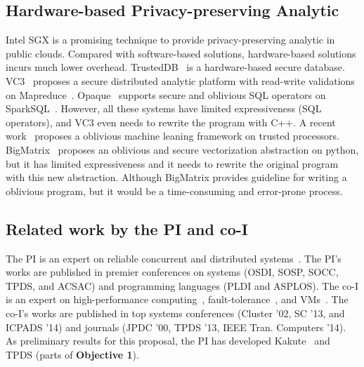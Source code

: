 \subsection{Hardware-based Privacy-preserving Analytic}
Intel SGX is a promising technique to provide privacy-preserving analytic
in public clouds. Compared with software-based solutions, hardware-based 
solutions
incurs much lower overhead. TrustedDB~\cite{trusteddb:sigmod11} is a
hardware-based secure database.
VC3~\cite{vc3:sp15} proposes a secure distributed analytic platform
with read-write validations on Mapreduce~\cite{mapreduce}. 
Opaque~\cite{opaque:nsdi17}
supports secure and oblivious SQL operators on 
SparkSQL~\cite{sparksql:sigmod15}.
However, all these systems have limited expressiveness (\eg SQL operators), and
VC3 even needs to rewrite the program with C++. A recent 
work~\cite{oblivious:security16} proposes a oblivious machine leaning
framework on trusted processors.
BigMatrix~\cite{bigmatrix:ccs17} proposes an oblivious and secure vectorization
abstraction on python, but it has limited expressiveness and it needs to
rewrite the original program with this new abstraction.
Although BigMatrix provides guideline for
writing a oblivious program, but it would be a time-consuming and error-prone
process.

\vspace{-.15in}\subsection{Related work by the PI and co-I} 
\label{sec:my-work}\vspace{-.075in}
% 

The PI is an expert on reliable concurrent and distributed 
systems~\cite{smt:cacm, cui:tern:osdi10, peregrine:sosp11,
parrot:sosp13, crane:sosp15, tripod:apsys16}. The 
PI's works are published in premier conferences on systems (OSDI, SOSP, SOCC, 
TPDS, and ACSAC) and programming languages (PLDI and ASPLOS). The co-I is an 
expert on high-performance 
computing~\cite{powerrock,hwang,jessica,cheung,khokhar}, fault-tolerance~\cite{ 
sheng,shengdi1}, and VMs~\cite{rhymes,shengdi,jessica2}. The 
co-I's works are published in top systems conferences (Cluster '02, SC '13, 
and ICPADS '14) and journals (JPDC '00, TPDS '13, IEEE Tran. Computers '14). As 
preliminary results for this \xxx proposal, the PI has 
developed Kakute~\cite{kakute:acsac17} and TPDS (parts of \textbf{Objective 
1}). 


